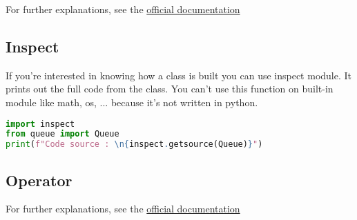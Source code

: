 \documentclass[a4paper, 12pt, titlepage]{scrartcl} %
\begin{document}
\vspace{5mm}

For further explanations, see the \href{https://docs.python.org/3/library/threading.html}{official documentation}


\subsection{Inspect}
If you're interested in knowing how a class is built you can use inspect module. It prints out the full code from the class. You can't use this function on built-in module like math, os, ... because it's not written in python.
\begin{lstlisting}[language=Python]
import inspect
from queue import Queue
print(f"Code source : \n{inspect.getsource(Queue)}")
\end{lstlisting} \vspace{5mm}

\subsection{Operator}
\label{subsec:Operator}
For further explanations, see the \href{https://docs.python.org/3/library/operator.html}{official documentation}
\end{document}
